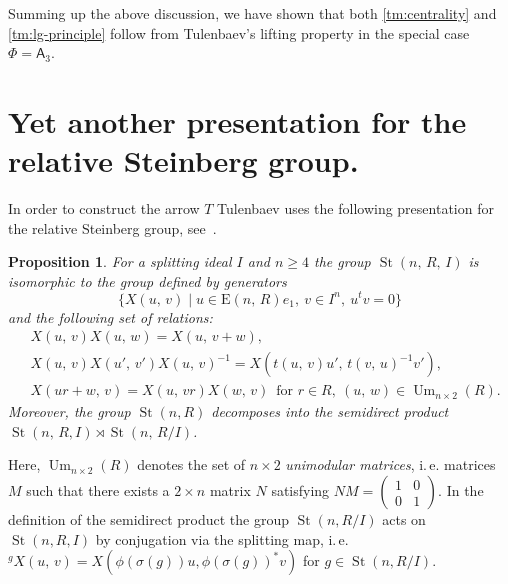 \documentclass[11pt]{amsart}
\theoremstyle{plain} \declaretheorem[name=Theorem, Refname={Theorem,Theorems}]{tm} \Crefname{tm}{Theorem}{Theorems}
\numberwithin{equation}{section}
\newtheorem{prop}[lm]{Proposition} \Crefname{prop}{Proposition}{Propositions}
\theoremstyle{definition} \newtheorem{df}[lm]{Definition} \Crefname{df}{Definition}{Definitions}
\theoremstyle{remark} \newtheorem{rk}[lm]{Remark} \Crefname{rk}{Remark}{Remarks}
\newcommand{\E}{{\mathrm{E}}}
\newcommand{\Um}{\mathop{\mathrm{Um}}\nolimits}
\newcommand{\St}{\mathop{\mathrm{St}}\nolimits}
\newcommand{\inv}{^{-1}}
\newcommand{\rA}{\mathsf{A}}
\begin{document}
Summing up the above discussion, we have shown that both \cref{tm:centrality} and \cref{tm:lg-principle} follow from Tulenbaev's lifting property in the special case $\Phi=\rA_3$.

\section{Yet another presentation for the relative Steinberg group.} \label{sec:yap}

In order to construct the arrow $T$ Tulenbaev uses the following presentation for the relative Steinberg group, see~\cite[Proposition~1.6]{Tul}. 
\setcounter{lm}{1}
\begin{prop}\label{prop:TulPres}
For a splitting ideal $I$ and $n\geq 4$ the group $\St(n,\,R,\,I)$ is isomorphic to the group defined by generators
$$\{X(u,\,v)\mid u\in\E(n,\,R)e_1,\ v\in I^n,\ u^tv=0\}$$ and the following set of relations:
\setcounter{equation}{0}
\renewcommand{\theequation}{T\arabic{equation}}
\begin{align}
&X(u,\,v)X(u,\,w)=X(u,\,v+w), \label{add2}\\
&X(u,\,v)X(u',\,v')X(u,\,v)\inv=X(t(u,\,v)u',\,t(v,\,u)\inv v'), \label{conj2}  \\
&X(ur+w,\,v)=X(u,\,vr)X(w,\,v)\,\text{ for }r\in R,\ (u,\,w)\in\Um_{n\times2}(R) \label{add3}.
\end{align}
Moreover, the group $\St(n, R)$ decomposes into the semidirect product $\St(n,\,R, I)\rtimes \St(n,\,R/I)$.
\end{prop}
Here, $\Um_{n\times2}(R)$ denotes the set of $n\times2$ \emph{unimodular matrices}, i.\,e. matrices $M$ such that there exists a $2\times n$ matrix $N$ satisfying $NM=\begin{pmatrix}1&0\\0&1\end{pmatrix}$.
In the definition of the semidirect product the group $\St(n, R/I)$ acts on $\St(n, R, I)$ by conjugation via the splitting map, i.\,e. ${}^g X(u,\,v) = X(\phi(\sigma(g))u, \phi(\sigma(g))^*v)$ for $g \in \St(n, R/I)$.
\end{document}
